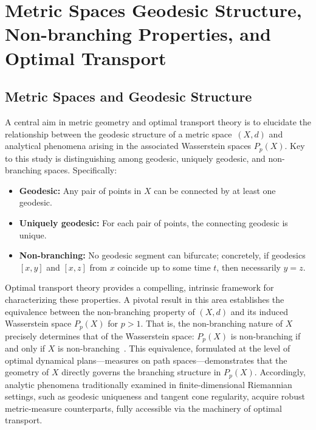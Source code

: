 \documentclass[sigconf]{acmart}
\begin{document}
\section{Metric Spaces Geodesic Structure, Non-branching Properties, and Optimal Transport}

\subsection{Metric Spaces and Geodesic Structure}

A central aim in metric geometry and optimal transport theory is to elucidate the relationship between the geodesic structure of a metric space~$(X, d)$ and analytical phenomena arising in the associated Wasserstein spaces $P_p(X)$. Key to this study is distinguishing among geodesic, uniquely geodesic, and non-branching spaces. Specifically:

\begin{itemize}
    \item \textbf{Geodesic:} Any pair of points in $X$ can be connected by at least one geodesic.
    \item \textbf{Uniquely geodesic:} For each pair of points, the connecting geodesic is unique.
    \item \textbf{Non-branching:} No geodesic segment can bifurcate; concretely, if geodesics $[x, y]$ and $[x, z]$ from $x$ coincide up to some time $t$, then necessarily $y = z$.
\end{itemize}

Optimal transport theory provides a compelling, intrinsic framework for characterizing these properties. A pivotal result in this area establishes the equivalence between the non-branching property of $(X, d)$ and its induced Wasserstein space $P_p(X)$ for $p > 1$. That is, the non-branching nature of $X$ precisely determines that of the Wasserstein space: $P_p(X)$ is non-branching if and only if $X$ is non-branching~\cite{ref107}. This equivalence, formulated at the level of optimal dynamical plans—measures on path spaces—demonstrates that the geometry of $X$ directly governs the branching structure in $P_p(X)$. Accordingly, analytic phenomena traditionally examined in finite-dimensional Riemannian settings, such as geodesic uniqueness and tangent cone regularity, acquire robust metric-measure counterparts, fully accessible via the machinery of optimal transport.
\end{document}
